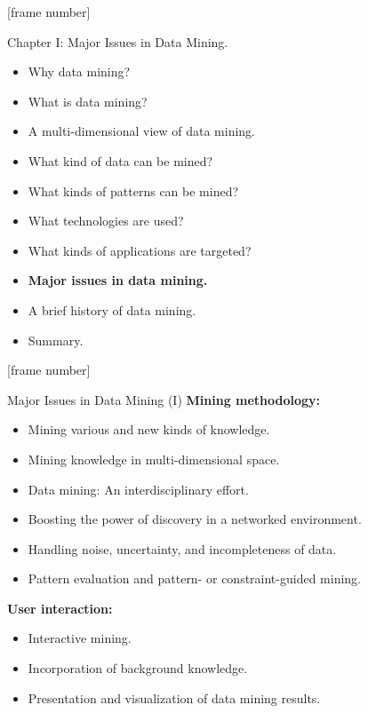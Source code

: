 \documentclass[aspectratio=169,t]{beamer}
\begin{document}
 {
    [frame number]
    \begin{frame}{Chapter I: Major Issues in Data Mining.}
        \begin{itemize}
            \item Why data mining?
            \item What is data mining?
            \item A multi-dimensional view of data mining.
            \item What kind of data can be mined?
            \item What kinds of patterns can be mined?
            \item What technologies are used?
            \item What kinds of applications are targeted?
            \item \textbf{Major issues in data mining.}
            \item A brief history of data mining.
            \item Summary.
        \end{itemize}
    \end{frame}
  }

  {
    [frame number]
    \begin{frame}{Major Issues in Data Mining (I)}
    \textbf{Mining methodology:}\\
    \begin{itemize}
        \item Mining various and new kinds of knowledge.
        \item Mining knowledge in multi-dimensional space.
        \item Data mining: An interdisciplinary effort.
        \item Boosting the power of discovery in a networked environment.
        \item Handling noise, uncertainty, and incompleteness of data.
        \item Pattern evaluation and pattern- or constraint-guided mining.
    \end{itemize}
    \textbf{User interaction:}\\
    \begin{itemize}
        \item Interactive mining.
        \item Incorporation of background knowledge.
        \item Presentation and visualization of data mining results.
    \end{itemize}
    \end{frame}
  }
\end{document}
